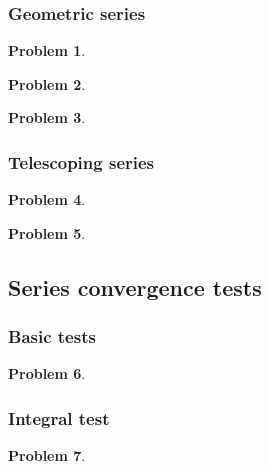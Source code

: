 \documentclass{article}
\newtheorem{problem}{Problem}
\begin{document}
\subsubsection{Geometric series}
\begin{problem}

\end{problem}
\begin{problem}

\end{problem}
\begin{problem}

\end{problem}

\subsubsection{Telescoping series}
\begin{problem}

\end{problem}

\begin{problem}

\end{problem}

\subsection{Series convergence tests}
\subsubsection{Basic tests}
\begin{problem}

\end{problem}



\subsubsection{Integral test}
\begin{problem}

\end{problem}

\end{document}
